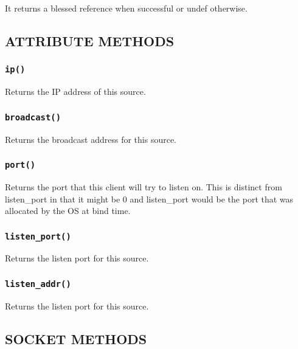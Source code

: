 \documentclass[12pt,a4paper]{article}
\begin{document}
It returns a blessed reference when successful or undef otherwise.

\subsection*{ATTRIBUTE METHODS\label{xPL::Listener_ATTRIBUTE_METHODS}}
\subsubsection*{\texttt{ip()}\label{xPL::Listener_ip_}}


Returns the IP address of this source.

\subsubsection*{\texttt{broadcast()}\label{xPL::Listener_broadcast_}}


Returns the broadcast address for this source.

\subsubsection*{\texttt{port()}\label{xPL::Listener_port_}}


Returns the port that this client will try to listen on.  This is distinct
from \textsf{listen\_port} in that it might be 0 and \textsf{listen\_port} would be the
port that was allocated by the OS at bind time.

\subsubsection*{\texttt{listen\_port()}\label{xPL::Listener_listen_port_}}


Returns the listen port for this source.

\subsubsection*{\texttt{listen\_addr()}\label{xPL::Listener_listen_addr_}}


Returns the listen port for this source.

\subsection*{SOCKET METHODS\label{xPL::Listener_SOCKET_METHODS}}
\end{document}

